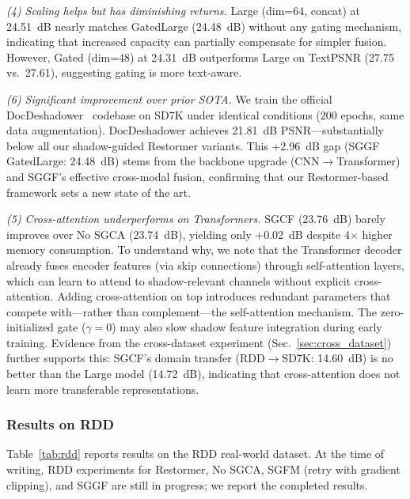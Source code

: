 \documentclass[11pt]{article}
\begin{document}
\textit{(4) Scaling helps but has diminishing returns.} Large (dim=64, concat) at 24.51~dB nearly matches GatedLarge (24.48~dB) without any gating mechanism, indicating that increased capacity can partially compensate for simpler fusion. However, Gated (dim=48) at 24.31~dB outperforms Large on TextPSNR (27.75 vs.~27.61), suggesting gating is more text-aware.

\textit{(6) Significant improvement over prior SOTA.} We train the official DocDeshadower~\cite{li2023single} codebase on SD7K under identical conditions (200 epochs, same data augmentation). DocDeshadower achieves 21.81~dB PSNR---substantially below all our shadow-guided Restormer variants. This +2.96~dB gap (SGGF GatedLarge: 24.48~dB) stems from the backbone upgrade (CNN$\rightarrow$Transformer) and SGGF's effective cross-modal fusion, confirming that our Restormer-based framework sets a new state of the art.

\textit{(5) Cross-attention underperforms on Transformers.} SGCF (23.76~dB) barely improves over No SGCA (23.74~dB), yielding only +0.02~dB despite 4$\times$ higher memory consumption.
To understand why, we note that the Transformer decoder already fuses encoder features (via skip connections) through self-attention layers, which can learn to attend to shadow-relevant channels without explicit cross-attention. Adding cross-attention on top introduces redundant parameters that compete with---rather than complement---the self-attention mechanism.
The zero-initialized gate ($\gamma=0$) may also slow shadow feature integration during early training.
Evidence from the cross-dataset experiment (Sec.~\ref{sec:cross_dataset}) further supports this: SGCF's domain transfer (RDD$\rightarrow$SD7K: 14.60~dB) is no better than the Large model (14.72~dB), indicating that cross-attention does not learn more transferable representations.

\subsubsection{Results on RDD}

Table~\ref{tab:rdd} reports results on the RDD real-world dataset.
At the time of writing, RDD experiments for Restormer, No SGCA, SGFM (retry with gradient clipping), and SGGF are still in progress; we report the completed results.
\end{document}
